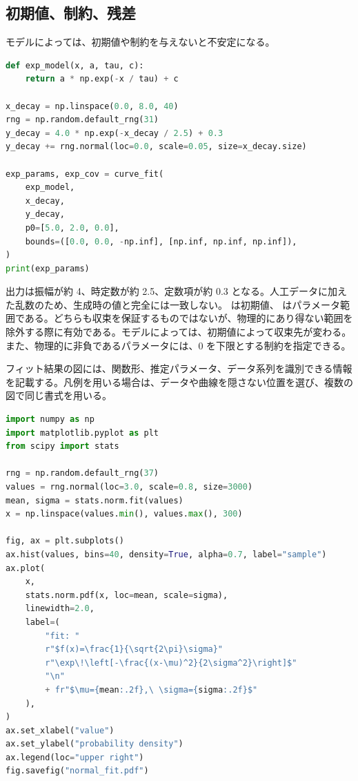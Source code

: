 \subsection{初期値、制約、残差}

モデルによっては、初期値や制約を与えないと不安定になる。

\begin{lstlisting}[language=Python]
def exp_model(x, a, tau, c):
    return a * np.exp(-x / tau) + c

x_decay = np.linspace(0.0, 8.0, 40)
rng = np.random.default_rng(31)
y_decay = 4.0 * np.exp(-x_decay / 2.5) + 0.3
y_decay += rng.normal(loc=0.0, scale=0.05, size=x_decay.size)

exp_params, exp_cov = curve_fit(
    exp_model,
    x_decay,
    y_decay,
    p0=[5.0, 2.0, 0.0],
    bounds=([0.0, 0.0, -np.inf], [np.inf, np.inf, np.inf]),
)
print(exp_params)
\end{lstlisting}

出力は振幅が約 4、時定数が約 2.5、定数項が約 0.3 となる。人工データに加えた乱数のため、生成時の値と完全には一致しない。 は初期値、 はパラメータ範囲である。どちらも収束を保証するものではないが、物理的にあり得ない範囲を除外する際に有効である。モデルによっては、初期値によって収束先が変わる。また、物理的に非負であるパラメータには、0 を下限とする制約を指定できる。

フィット結果の図には、関数形、推定パラメータ、データ系列を識別できる情報を記載する。凡例を用いる場合は、データや曲線を隠さない位置を選び、複数の図で同じ書式を用いる。

\begin{lstlisting}[language=Python]
import numpy as np
import matplotlib.pyplot as plt
from scipy import stats

rng = np.random.default_rng(37)
values = rng.normal(loc=3.0, scale=0.8, size=3000)
mean, sigma = stats.norm.fit(values)
x = np.linspace(values.min(), values.max(), 300)

fig, ax = plt.subplots()
ax.hist(values, bins=40, density=True, alpha=0.7, label="sample")
ax.plot(
    x,
    stats.norm.pdf(x, loc=mean, scale=sigma),
    linewidth=2.0,
    label=(
        "fit: "
        r"$f(x)=\frac{1}{\sqrt{2\pi}\sigma}"
        r"\exp\!\left[-\frac{(x-\mu)^2}{2\sigma^2}\right]$"
        "\n"
        + fr"$\mu={mean:.2f},\ \sigma={sigma:.2f}$"
    ),
)
ax.set_xlabel("value")
ax.set_ylabel("probability density")
ax.legend(loc="upper right")
fig.savefig("normal_fit.pdf")
\end{lstlisting}

